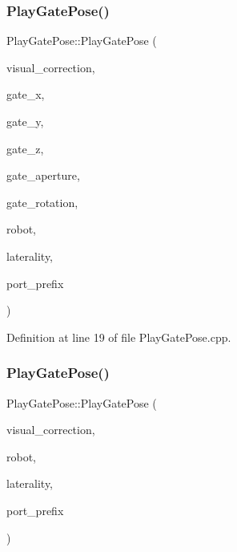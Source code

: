 \subsubsection{\texorpdfstring{Play\+Gate\+Pose()}{PlayGatePose()}\hspace{0.1cm}{\footnotesize\ttfamily [1/2]}}
{\footnotesize\ttfamily Play\+Gate\+Pose\+::\+Play\+Gate\+Pose (\begin{DoxyParamCaption}\item[{std\+::unique\+\_\+ptr$<$ P\+F\+Visual\+Correction $>$}]{visual\+\_\+correction,  }\item[{const double}]{gate\+\_\+x,  }\item[{const double}]{gate\+\_\+y,  }\item[{const double}]{gate\+\_\+z,  }\item[{const double}]{gate\+\_\+aperture,  }\item[{const double}]{gate\+\_\+rotation,  }\item[{const yarp\+::os\+::\+Const\+String \&}]{robot,  }\item[{const yarp\+::os\+::\+Const\+String \&}]{laterality,  }\item[{const yarp\+::os\+::\+Const\+String \&}]{port\+\_\+prefix }\end{DoxyParamCaption})\hspace{0.3cm}{\ttfamily [noexcept]}}



Definition at line 19 of file Play\+Gate\+Pose.\+cpp.

\mbox{\label{classPlayGatePose_a8fdd90dc3b3f2b4c2f93e31d11aaabce}} 
\subsubsection{\texorpdfstring{Play\+Gate\+Pose()}{PlayGatePose()}\hspace{0.1cm}{\footnotesize\ttfamily [2/2]}}
{\footnotesize\ttfamily Play\+Gate\+Pose\+::\+Play\+Gate\+Pose (\begin{DoxyParamCaption}\item[{std\+::unique\+\_\+ptr$<$ P\+F\+Visual\+Correction $>$}]{visual\+\_\+correction,  }\item[{const yarp\+::os\+::\+Const\+String \&}]{robot,  }\item[{const yarp\+::os\+::\+Const\+String \&}]{laterality,  }\item[{const yarp\+::os\+::\+Const\+String \&}]{port\+\_\+prefix }\end{DoxyParamCaption})\hspace{0.3cm}{\ttfamily [noexcept]}}



